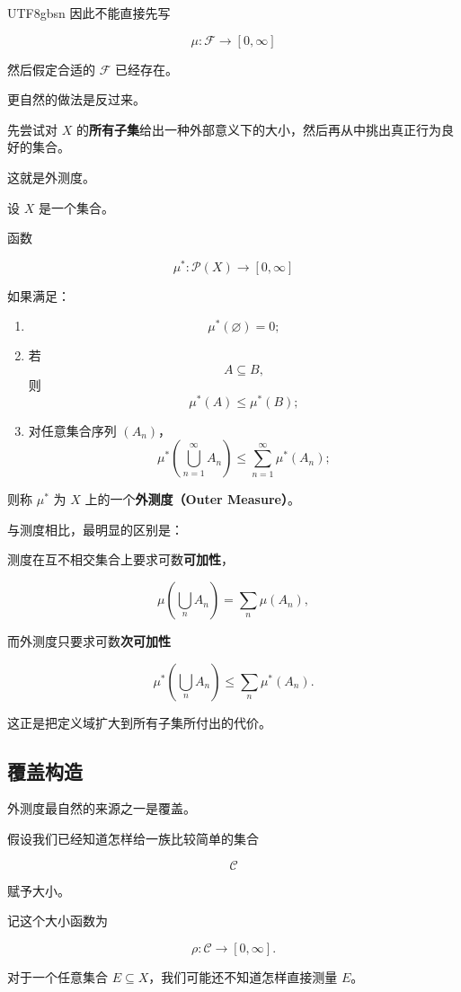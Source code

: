 \documentclass[11pt]{article}
\begin{document}
\begin{CJK*}{UTF8}{gbsn}
因此不能直接先写

\[
\mu:\mathcal{F}\rightarrow[0,\infty]
\]

然后假定合适的 $\mathcal{F}$ 已经存在。

更自然的做法是反过来。

先尝试对 $X$ 的\textbf{所有子集}给出一种外部意义下的大小，然后再从中挑出真正行为良好的集合。

这就是外测度。

设 $X$ 是一个集合。

函数

\[
\mu^{*}:\mathcal{P}(X)\rightarrow[0,\infty]
\]

如果满足：

\begin{enumerate}
  \item \[
  \mu^{*}(\varnothing)=0;
  \]
  \item 若
  \[
  A\subseteq B,
  \]
  则
  \[
  \mu^{*}(A)\leq\mu^{*}(B);
  \]
  \item 对任意集合序列 $(A_{n})$，
  \[
  \mu^{*}\left(\bigcup_{n=1}^{\infty}A_{n}\right)\leq\sum_{n=1}^{\infty}\mu^{*}(A_{n});
  \]
\end{enumerate}

则称 $\mu^{*}$ 为 $X$ 上的一个\textbf{外测度（Outer Measure）}。

与测度相比，最明显的区别是：

测度在互不相交集合上要求可数\textbf{可加性}，

\[
\mu\left(\bigcup_{n}A_{n}\right)=\sum_{n}\mu(A_{n}),
\]

而外测度只要求可数\textbf{次可加性}

\[
\mu^{*}\left(\bigcup_{n}A_{n}\right)\leq\sum_{n}\mu^{*}(A_{n}).
\]

这正是把定义域扩大到所有子集所付出的代价。

\subsection{覆盖构造}

外测度最自然的来源之一是覆盖。

假设我们已经知道怎样给一族比较简单的集合

\[
\mathcal{C}
\]

赋予大小。

记这个大小函数为

\[
\rho:\mathcal{C}\rightarrow[0,\infty].
\]

对于一个任意集合 $E\subseteq X$，我们可能还不知道怎样直接测量 $E$。


\end{CJK*}
\end{document}
